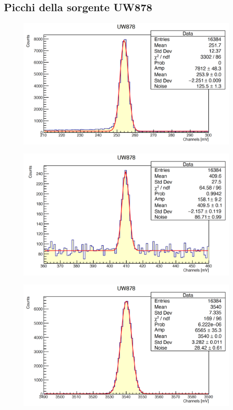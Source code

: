 \documentclass[a4paper,10pt]{article}
\begin{document}
\subsection{Picchi della sorgente UW878}
\begin{figure}[H]
    \centering
    \includegraphics[scale=0.45]{appendice/u1}
\end{figure}
\begin{figure}[H]
    \centering
    \includegraphics[scale=0.45]{appendice/u2}
\end{figure}
\begin{figure}[H]
    \centering
    \includegraphics[scale=0.45]{appendice/u3}
\end{figure}
\end{document}
